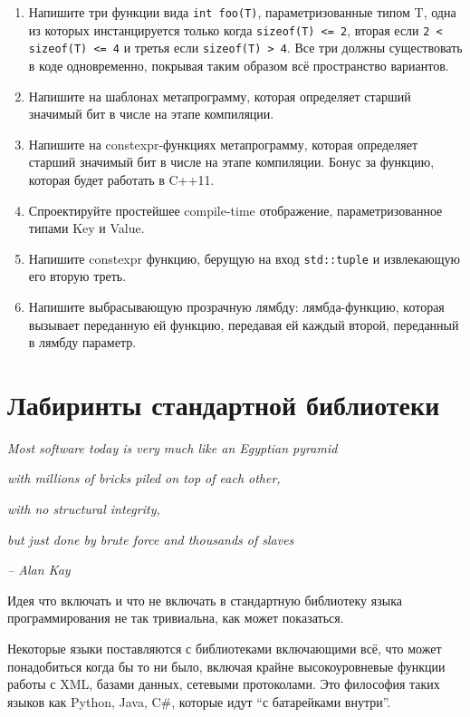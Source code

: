 \documentclass[a4paper,12pt,oneside]{book}
\begin{document}
\begin{enumerate}
\item 
Напишите три функции вида \lstinline!int foo(T)!, параметризованные типом T, одна из которых инстанцируется только когда \lstinline!sizeof(T) <= 2!, вторая если \lstinline!2 < sizeof(T) <= 4! и третья если \lstinline!sizeof(T) > 4!. Все три должны существовать в коде одновременно, покрывая таким образом всё пространство вариантов.

\item 
Напишите на шаблонах метапрограмму, которая определяет старший значимый бит в числе на этапе компиляции.

\item 
Напишите на constexpr-функциях метапрограмму, которая определяет старший значимый бит в числе на этапе компиляции. Бонус за функцию, которая будет работать в C++11.

\item 
Спроектируйте простейшее compile-time отображение, параметризованное типами Key и Value.

\item 
Напишите constexpr функцию, берущую на вход \lstinline!std::tuple! и извлекающую его вторую треть.

\item 
Напишите выбрасывающую прозрачную лямбду: лямбда-функцию, которая вызывает переданную ей функцию, передавая ей каждый второй, переданный в лямбду параметр.

\end{enumerate}

\pagebreak
\chapter{Лабиринты стандартной библиотеки}\label{chap:stl}

\hfill\textit{Most software today is very much like an Egyptian pyramid}

\hfill\textit{with millions of bricks piled on top of each other,}

\hfill\textit{with no structural integrity,}

\hfill\textit{but just done by brute force and thousands of slaves}{\vspace{0.5em}}

\hfill\textit{-- Alan Kay}

Идея что включать и что не включать в стандартную библиотеку языка программирования не так тривиальна, как может показаться.

Некоторые языки поставляются с библиотеками включающими всё, что может понадобиться когда бы то ни было, включая крайне высокоуровневые функции работы с XML, базами данных, сетевыми протоколами. Это философия таких языков как Python, Java, C\#, которые идут ``с батарейками внутри''.
\end{document}
